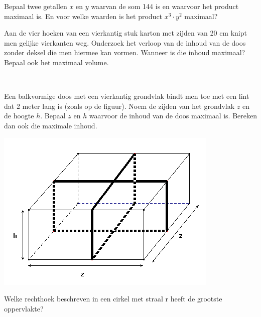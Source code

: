 \documentclass[12pt]{article}
\begin{document}
\begin{oefening}
  Bepaal twee getallen $x$ en $y$ waarvan de som 144 is en waarvoor het product maximaal
  is. En voor welke waarden is het product $x^3\cdot y^2$ maximaal?
\end{oefening}

\begin{oefening}
  Aan de vier hoeken van een vierkantig stuk karton met zijden van 20 cm knipt men
  gelijke vierkanten weg. Onderzoek het verloop van de inhoud van de doos zonder
  deksel die men hiermee kan vormen. Wanneer is die inhoud maximaal? Bepaal ook
  het maximaal volume.
\end{oefening}

\begin{oefening}\\
  \begin{minipage}{0.6\textwidth}
    Een balkvormige doos met een vierkantig grondvlak bindt men toe met een lint dat
    2 meter lang is (zoals op de figuur). Noem de zijden van het grondvlak $z$ en de hoogte
    $h$. Bepaal $z$ en $h$ waarvoor de inhoud van de doos maximaal is. Bereken dan ook die
    maximale inhoud.
  \end{minipage}
  \begin{minipage}{0.4\textwidth}
    \centering
    \includegraphics[width=\textwidth]{doos-met-lint}
  \end{minipage}
\end{oefening}

\begin{oefening}
  Welke rechthoek beschreven in een cirkel met straal r heeft de grootste oppervlakte?
\end{oefening}
\end{document}
